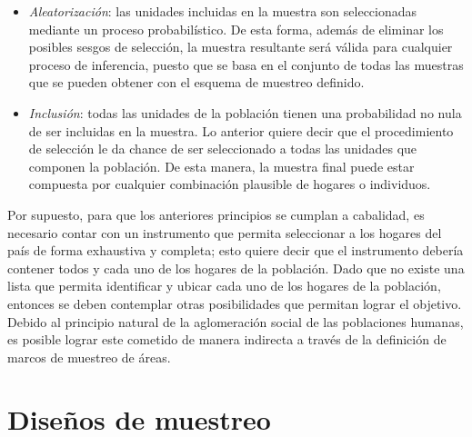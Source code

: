 \documentclass[12pt,spanish,]{book}
\providecommand{\tightlist}{%
  \setlength{\itemsep}{0pt}\setlength{\parskip}{0pt}}
\begin{document}
\begin{itemize}
\tightlist
\item
  \emph{Aleatorización}: las unidades incluidas en la muestra son seleccionadas mediante un proceso probabilístico. De esta forma, además de eliminar los posibles sesgos de selección, la muestra resultante será válida para cualquier proceso de inferencia, puesto que se basa en el conjunto de todas las muestras que se pueden obtener con el esquema de muestreo definido.
\item
  \emph{Inclusión}: todas las unidades de la población tienen una probabilidad no nula de ser incluidas en la muestra. Lo anterior quiere decir que el procedimiento de selección le da chance de ser seleccionado a todas las unidades que componen la población. De esta manera, la muestra final puede estar compuesta por cualquier combinación plausible de hogares o individuos.
\end{itemize}

Por supuesto, para que los anteriores principios se cumplan a cabalidad, es necesario contar con un instrumento que permita seleccionar a los hogares del país de forma exhaustiva y completa; esto quiere decir que el instrumento debería contener todos y cada uno de los hogares de la población. Dado que no existe una lista que permita identificar y ubicar cada uno de los hogares de la población, entonces se deben contemplar otras posibilidades que permitan lograr el objetivo. Debido al principio natural de la aglomeración social de las poblaciones humanas, es posible lograr este cometido de manera indirecta a través de la definición de marcos de muestreo de áreas.

\hypertarget{disenos-de-muestreo}{%
\section{Diseños de muestreo}\label{disenos-de-muestreo}}
\end{document}
